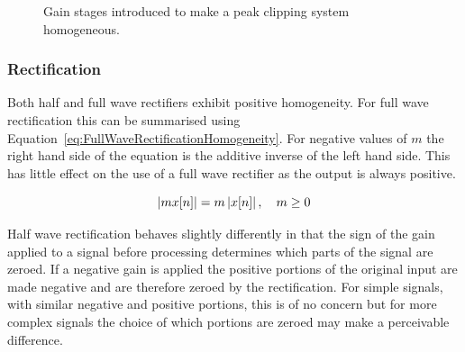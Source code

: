 			\begin{figure}[h!]
				\centering
				\caption{Gain stages introduced to make a peak clipping system homogeneous.}
				\label{fig:HomogeneousClipping}
			\end{figure}

		\subsubsection*{Rectification}
			Both half and full wave rectifiers exhibit positive homogeneity. For full wave rectification this
			can be summarised using Equation~\ref{eq:FullWaveRectificationHomogeneity}. For negative values of
			$m$ the right hand side of the equation is the additive inverse of the left hand side. This has
			little effect on the use of a full wave rectifier as the output is always positive.

			\begin{equation}
				\left|mx[n]\right| = m\left|x[n]\right|, \quad m \geq 0
				\label{eq:FullWaveRectificationHomogeneity}
			\end{equation}

			Half wave rectification behaves slightly differently in that the sign of the gain applied to a
			signal before processing determines which parts of the signal are zeroed. If a negative gain is
			applied the positive portions of the original input are made negative and are therefore zeroed by
			the rectification. For simple signals, with similar negative and positive portions, this is of no
			concern but for more complex signals the choice of which portions are zeroed may make a perceivable
			difference.


